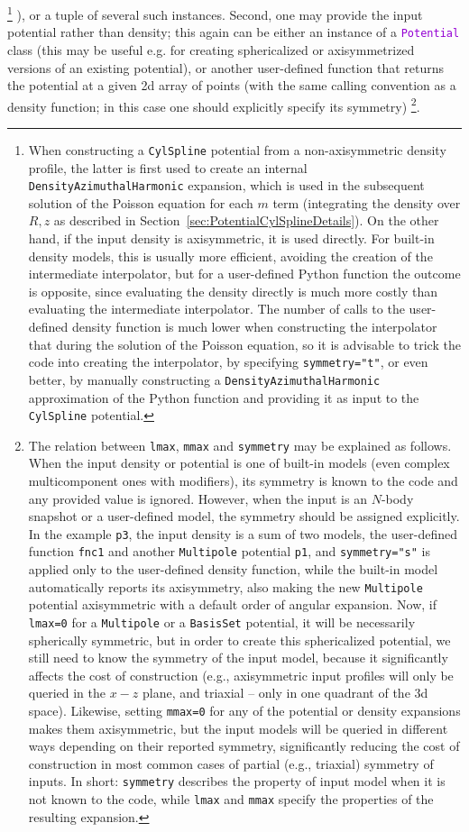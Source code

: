 \documentclass[12pt]{article}
\newcommand{\ttt}[1]{\textcolor{darkviolet}{\texttt{#1}}}
\newcommand{\ppp}[1]{\textcolor{darkolive} {\texttt{#1}}}
\begin{document}
\footnote{When constructing a \ppp{CylSpline} potential from a non-axisymmetric density profile, the latter is first used to create an internal \ppp{DensityAzimuthalHarmonic} expansion, which is used in the subsequent solution of the Poisson equation for each $m$ term (integrating the density over $R,z$ as described in Section~\ref{sec:PotentialCylSplineDetails}). On the other hand, if the input density is axisymmetric, it is used directly. For built-in density models, this is usually more efficient, avoiding the creation of the intermediate interpolator, but for a user-defined Python function the outcome is opposite, since evaluating the density directly is much more costly than evaluating the intermediate interpolator. The number of calls to the user-defined density function is much lower when constructing the interpolator that during the solution of the Poisson equation, so it is advisable to trick the code into creating the interpolator, by specifying \ppp{symmetry}\texttt{="t"}, or even better, by manually constructing a \ppp{DensityAzimuthalHarmonic} approximation of the Python function and providing it as input to the \ppp{CylSpline} potential.}%
), or a tuple of several such instances. Second, one may provide the input potential rather than density; this again can be either an instance of a \ttt{Potential} class (this may be useful e.g. for creating sphericalized or axisymmetrized versions of an existing potential), or another user-defined function that returns the potential at a given 2d array of points (with the same calling convention as a density function; in this case one should explicitly specify its symmetry)%
\footnote{The relation between \ppp{lmax}, \ppp{mmax} and \ppp{symmetry} may be explained as follows. When the input density or potential is one of built-in models (even complex multicomponent ones with modifiers), its symmetry is known to the code and any provided value is ignored. However, when the input is an $N$-body snapshot or a user-defined model, the symmetry should be assigned explicitly. In the example \texttt{p3}, the input density is a sum of two models, the user-defined function \texttt{fnc1} and another \ppp{Multipole} potential \texttt{p1}, and \ppp{symmetry}\texttt{="s"} is applied only to the user-defined density function, while the built-in model automatically reports its axisymmetry, also making the new \ppp{Multipole} potential axisymmetric with a default order of angular expansion. Now, if \ppp{lmax}\texttt{=0} for a \ppp{Multipole} or a \ppp{BasisSet} potential, it will be necessarily spherically symmetric, but in order to create this sphericalized potential, we still need to know the symmetry of the input model, because it significantly affects the cost of construction (e.g., axisymmetric input profiles will only be queried in the $x-z$ plane, and triaxial -- only in one quadrant of the 3d space). Likewise, setting \ppp{mmax}\texttt{=0} for any of the potential or density expansions makes them axisymmetric, but the input models will be queried in different ways depending on their reported symmetry, significantly reducing the cost of construction in most common cases of partial (e.g., triaxial) symmetry of inputs. In short: \ppp{symmetry} describes the property of input model when it is not known to the code, while \ppp{lmax} and \ppp{mmax} specify the properties of the resulting expansion.}.
\end{document}
